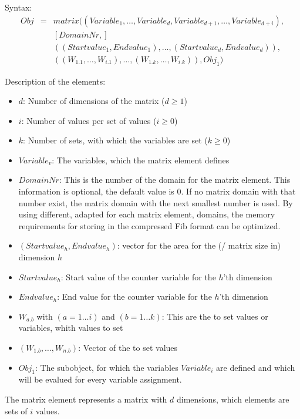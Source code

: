 \bigskip\noindent
Syntax:
\begin{eqnarray*}
Obj &=& matrix( (Variable_1, \ldots, Variable_d, Variable_{d+1}, \ldots, Variable_{d+i}),\\
&& [DomainNr,] \\
&& ( (Startvalue_1, Endvalue_1), \ldots, (Startvalue_d, Endvalue_d) ),\\
&& ( (W_{1.1}, \ldots, W_{i.1}), \ldots, (W_{1.k}, \ldots, W_{i.k}) ), Obj_1)
\end{eqnarray*}

\bigskip\noindent
Description of the elements:
\begin{itemize}
 \item $d$: Number of dimensions of the matrix ($d \geq 1$)
 \item $i$: Number of values per set of values ($i \geq 0$)
 \item $k$: Number of sets, with which the variables are set ($k \geq 0$)
 \item $Variable_v$: The variables, which the matrix element defines
 \item $DomainNr$: This is the number of the domain for the matrix element. This information is optional, the default value is 0. If no matrix domain with that number exist, the matrix domain with the next smallest number is used. By using different, adapted for each matrix element, domains, the memory requirements for storing in the compressed Fib format can be optimized.
 \item $(Startvalue_h, Endvalue_h)$: vector for the area for the (/ matrix size in) dimension $h$
 \item $Startvalue_h$: Start value of the counter variable for the $h$'th dimension
 \item $Endvalue_h$: End value for the counter variable for the $h$'th dimension
 \item $W_{a.b}$ with $(a = 1 \ldots i)$ and $(b = 1 \ldots k)$: This are the to set values or variables, whith values to set
 \item $(W_{1.b}, \ldots, W_{n.b})$: Vector of the to set values
 \item $Obj_1$: The subobject, for which the variables $Variable_i$ are defined and which will be evalued for every variable assignment.
\end{itemize}

The matrix element represents a matrix with $d$ dimensions, which elements are sets of $i$ values.


